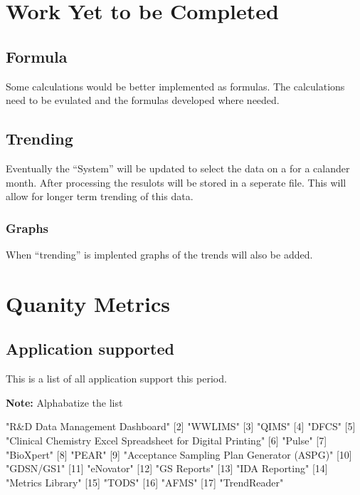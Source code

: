 \documentclass{article}
\begin{document}
\section{Work Yet to be Completed}
\subsection{Formula}
Some calculations would be better implemented as formulas. The calculations need
to be evulated and the formulas developed where needed.
\subsection{Trending}
Eventually the ``System'' will be updated to select the data on a for a calander
month. After processing the resulots will be stored in a seperate file.
This will allow for longer term trending of this data.
\subsubsection{Graphs}
When ``trending'' is implented graphs of the trends will also be added.


\section{Quanity Metrics}
\subsection{Application supported}
This is a list of all application support this period.

\textbf{Note:} Alphabatize the list

\begin{Schunk}
\begin{Soutput}
 [1] "R&D Data Management Dashboard"                            
 [2] "WWLIMS"                                                   
 [3] "QIMS"                                                     
 [4] "DFCS"                                                     
 [5] "Clinical Chemistry Excel Spreadsheet for Digital Printing"
 [6] "Pulse"                                                    
 [7] "BioXpert"                                                 
 [8] "PEAR"                                                     
 [9] "Acceptance Sampling Plan Generator (ASPG)"                
[10] "GDSN/GS1"                                                 
[11] "eNovator"                                                 
[12] "GS Reports"                                               
[13] "IDA Reporting"                                            
[14] "Metrics Library"                                          
[15] "TODS"                                                     
[16] "AFMS"                                                     
[17] "TrendReader"                                              
\end{Soutput}
\end{Schunk}
\end{document}
